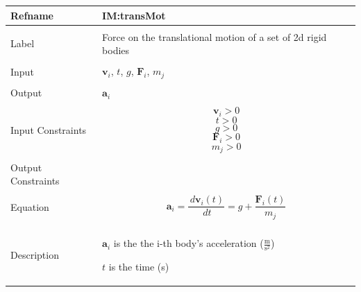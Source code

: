 \documentclass[12pt]{article}
\begin{document}
\noindent \begin{minipage}{\textwidth}
\begin{tabular}{>{\raggedright}p{}>{\raggedright\arraybackslash}p{}}
\toprule \textbf{Refname} & \textbf{IM:transMot}
\label{IM:transMot}
\\ \midrule \\
Label & Force on the translational motion of a set of 2d rigid bodies
\\ \midrule \\
Input & ${\mathbf{v}_{i}}$, $t$, $g$, ${\mathbf{F}_{i}}$, ${m_{j}}$
\\ \midrule \\
Output & ${\mathbf{a}_{i}}$
\\ \midrule \\
Input Constraints & \begin{displaymath}
                    {\mathbf{v}_{i}}>0
                    \end{displaymath}
                    \begin{displaymath}
                    t>0
                    \end{displaymath}
                    \begin{displaymath}
                    g>0
                    \end{displaymath}
                    \begin{displaymath}
                    {\mathbf{F}_{i}}>0
                    \end{displaymath}
                    \begin{displaymath}
                    {m_{j}}>0
                    \end{displaymath}
\\ \midrule \\
Output Constraints & 
\\ \midrule \\
Equation & \begin{displaymath}
           {\mathbf{a}_{i}}=\frac{\,d{\mathbf{v}_{i}}\left(t\right)}{\,dt}=g+\frac{{\mathbf{F}_{i}}\left(t\right)}{{m_{j}}}
           \end{displaymath}
\\ \midrule \\
Description & \begin{symbDescription}
              \item{${\mathbf{a}_{i}}$ is the the i-th body's acceleration ($\frac{\text{m}}{\text{s}^{2}}$)}
              \item{$t$ is the time (s)}

\end{symbDescription}
\end{tabular}
\end{minipage}
\end{document}
